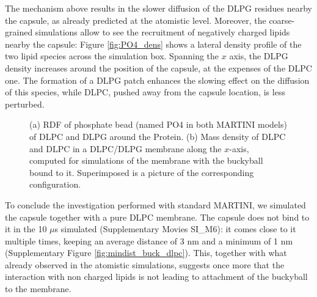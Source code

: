 The mechanism above results in the slower diffusion of the DLPG residues nearby the capsule, as already predicted at the atomistic level. Moreover, the coarse-grained simulations allow to see the recruitment of negatively charged lipids nearby the capsule: Figure \ref{fig:PO4_dens} shows a lateral density profile of the two lipid species across the simulation box. Spanning the $x$ axis, the DLPG density increases around the position of the capsule, at the expenses of the DLPC one. The formation of a DLPG patch enhances the slowing effect on the diffusion of this species, while DLPC, pushed away from the capsule location, is less perturbed.

\begin{figure}[t!]
\centering
{}
\caption[Proximity of lipids phosphate to bound capsule (MARTINI simulations)]{(a) RDF of phosphate bead (named PO4 in both MARTINI models) of DLPC and DLPG around the Protein. (b) Mass density of DLPC and DLPC in a DLPC/DLPG membrane along the $x$-axis, computed for simulations of the membrane with the buckyball bound to it. Superimposed is a picture of the corresponding configuration.}
\label{fig:PO4_RDF_dens}
\end{figure}

To conclude the investigation performed with standard MARTINI, we simulated the capsule together with a pure DLPC membrane. The capsule does not bind to it in the 10 $\mu$s simulated (Supplementary Movies SI\_M6): it comes close to it multiple times, keeping an average distance of 3 nm and a minimum of 1 nm (Supplementary Figure \ref{fig:mindist_buck_dlpc}). This, together with what already observed in the atomistic simulations, suggests once more that the interaction with non charged lipids is not leading to attachment of the buckyball to the membrane.

